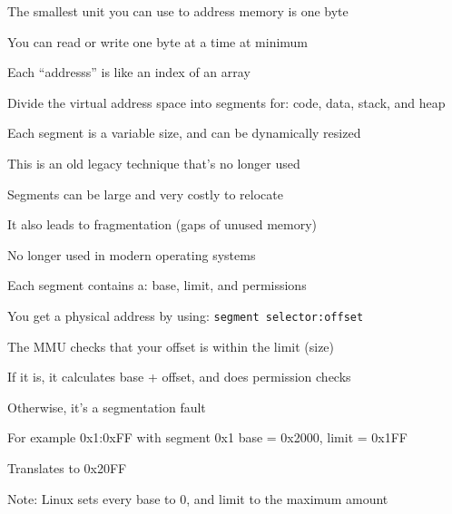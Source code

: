 \begin{slide}


    The smallest unit you can use to address memory is one byte
    \medskip

    You can read or write one byte at a time at minimum
    \medskip

    Each ``addresss'' is like an index of an array

\end{slide}

\begin{slide}


    Divide the virtual address space into segments for: code, data, stack, and heap


    Each segment is a variable size, and can be dynamically resized

    \leftspace{}This is an old legacy technique that's no longer used
    \medskip

    Segments can be large and very costly to relocate

    \leftspace{}It also leads to fragmentation (gaps of unused memory)
    \medskip

    No longer used in modern operating systems

\end{slide}

\begin{slide}


    Each segment contains a: base, limit, and permissions

    \leftspace{}You get a physical address by using: \texttt{segment selector:offset}
    \medskip

    The MMU checks that your offset is within the limit (size)

    \leftspace{}If it is, it calculates base + offset, and does permission checks

    \leftspace{}\leftspace{}Otherwise, it's a segmentation fault
    \medskip

    For example 0x1:0xFF with segment 0x1 base = 0x2000, limit = 0x1FF

    \leftspace{}Translates to 0x20FF
    \medskip

    Note: Linux sets every base to 0, and limit to the maximum amount

\end{slide}

